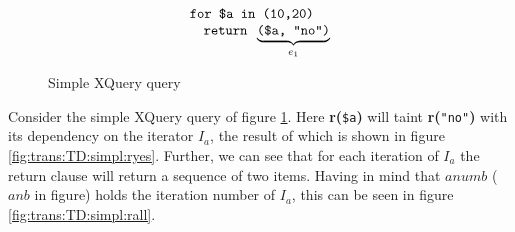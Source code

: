 \noindent
\begin{myExample}

\begin{figure}[h]
\begin{equation*}
\begin{array}{l}
\mbox{\texttt{for \$a in (10,20)}} \\ \quad
\mbox{\texttt{return }} \underbrace{ \mbox{\texttt{(\$a, "no")}} }_{e_{1}}
\end{array}
\end{equation*}
\caption{Simple XQuery query}
\label{fig:trans:TD:simpQuery}
\end{figure}
Consider the simple XQuery query of figure \ref{fig:trans:TD:simpQuery}. Here \textbf{r(}\texttt{\$a}\textbf{)}
will taint \textbf{r(}\texttt{"no"}\textbf{)} with its dependency on the iterator $I_{a}$, the result of which is shown in figure \ref{fig:trans:TD:simpl:ryes}. Further, we can see that
for each iteration of $I_{a}$ the return clause will return a sequence of two items. Having in mind that $anumb$
($anb$ in figure) holds the iteration number of $I_{a}$, this can be seen in figure \ref{fig:trans:TD:simpl:rall}.

\begin{figure}[!h]
\centering
{}
\qquad
{}
\qquad
{}


\end{figure}
\end{myExample}
